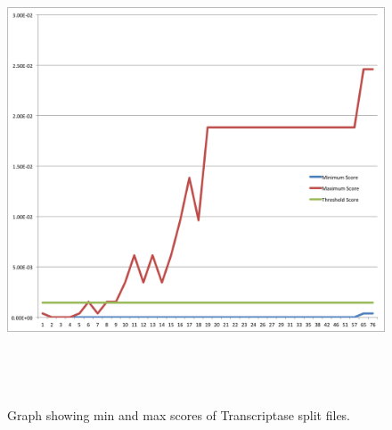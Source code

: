 \begin{figure}[h]
    \centering    
    \includegraphics[width=16cm, height=13.85cm]{external.png}
    \caption[Graph showing min and max scores of split files ]{Graph showing min and max scores of Transcriptase split files.}
    \label{fig:splitgraph}
\end{figure}